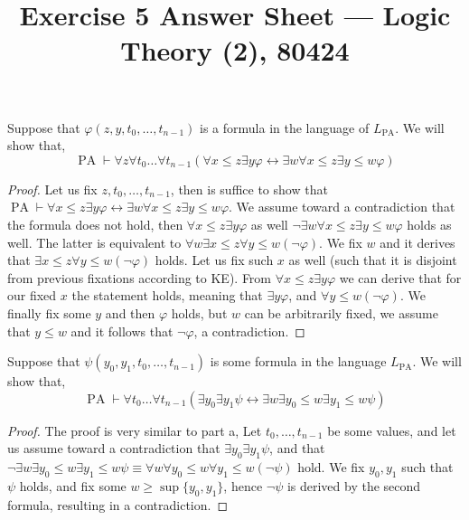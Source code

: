 
\title{Exercise 5 Answer Sheet --- Logic Theory (2), 80424}


\maketitle
\maketitleprint[yellow]

\question{}
\subquestion{}
Suppose that $\varphi(z, y, t_0, \ldots, t_{n - 1})$ is a formula in the language of $L_{\operatorname{PA}}$.
We will show that,
\[
	\operatorname{PA} \vdash \forall z \forall t_0 \ldots \forall t_{n - 1} (\forall x \le z \exists y \varphi \leftrightarrow \exists w \forall x \le z \exists y \le w \varphi)
\]
\begin{proof}
	Let us fix $z, t_0, \ldots, t_{n - 1}$, then is suffice to show that $\operatorname{PA} \vdash \forall x \le z \exists y \varphi \leftrightarrow \exists w \forall x \le z \exists y \le w \varphi$.
	We assume toward a contradiction that the formula does not hold, then $\forall x \le z \exists y \varphi$ as well $\lnot \exists w \forall x \le z \exists y \le w \varphi$ holds as well.
	The latter is equivalent to $\forall w \exists x \le z \forall y \le w (\lnot \varphi)$.
	We fix $w$ and it derives that $\exists x \le z \forall y \le w (\lnot \varphi)$ holds.
	Let us fix such $x$ as well (such that it is disjoint from previous fixations according to KE).
	From $\forall x \le z \exists y \varphi$ we can derive that for our fixed $x$ the statement holds, meaning that $\exists y \varphi$, and $\forall y \le w (\lnot \varphi)$.
	We finally fix some $y$ and then $\varphi$ holds, but $w$ can be arbitrarily fixed, we assume that $y \le w$ and it follows that $\lnot \varphi$, a contradiction.
\end{proof}

\subquestion{}
Suppose that $\psi(y_0, y_1, t_0, \ldots, t_{n - 1})$ is some formula in the language $L_{\operatorname{PA}}$.
We will show that,
\[
	\operatorname{PA}
	\vdash \forall t_0 \ldots \forall t_{n - 1} (\exists y_0 \exists y_1 \psi \leftrightarrow \exists w \exists y_0 \le w \exists y_1 \le w \psi)
\]
\begin{proof}
	The proof is very similar to part a,
	Let $t_0, \ldots, t_{n - 1}$ be some values, and let us assume toward a contradiction that $\exists y_0 \exists y_1 \psi$,
	and that $\lnot \exists w \exists y_0 \le w \exists y_1 \le w \psi \equiv \forall w \forall y_0 \le w \forall y_1 \le w (\lnot \psi)$ hold.
	We fix $y_0, y_1$ such that $\psi$ holds, and fix some $w \ge \sup\{ y_0, y_1 \}$, hence $\lnot \psi$ is derived by the second formula, resulting in a contradiction.
\end{proof}

